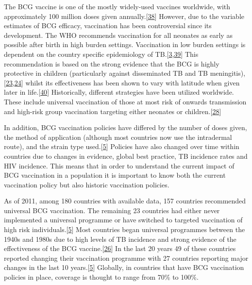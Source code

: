 \documentclass[11pt,twoside]{bristolthesis}
\begin{document}
  The BCG vaccine is one of the mostly widely-used vaccines worldwide, with approximately 100 million doses given annually.{[}\protect\hyperlink{ref-The2004}{38}{]} However, due to the variable estimates of BCG efficacy, vaccination has been controversial since its development. The WHO recommends vaccination for all neonates as early as possible after birth in high burden settings. Vaccination in low burden settings is dependent on the country specific epidemiology of TB.{[}\protect\hyperlink{ref-TheWorldHealthOrganization:2018va}{3},\protect\hyperlink{ref-WHO2017}{39}{]} This recommendation is based on the strong evidence that the BCG is highly protective in children (particularly against disseminated TB and TB meningitis),{[}\protect\hyperlink{ref-Rodrigues1993}{23},\protect\hyperlink{ref-Colditz1994}{24}{]} whilst its effectiveness has been shown to vary with latitude when given later in life.{[}\protect\hyperlink{ref-Mangtani2014}{40}{]} Historically, different strategies have been utilized worldwide. These include universal vaccination of those at most risk of onwards transmission and high-risk group vaccination targeting either neonates or children.{[}\protect\hyperlink{ref-Abubakar2013}{28}{]}
  
  In addition, BCG vaccination policies have differed by the number of doses given, the method of application (although most countries now use the intradermal route), and the strain type used.{[}\protect\hyperlink{ref-Zwerling2011a}{5}{]} Policies have also changed over time within countries due to changes in evidence, global best practice, TB incidence rates and HIV incidence. This means that in order to understand the current impact of BCG vaccination in a population it is important to know both the current vaccination policy but also historic vaccination policies.
  
  As of 2011, among 180 countries with available data, 157 countries recommended universal BCG vaccination. The remaining 23 countries had either never implemented a universal programme or have switched to targeted vaccination of high risk individuals.{[}\protect\hyperlink{ref-Zwerling2011a}{5}{]} Most countries began universal programmes between the 1940s and 1980s due to high levels of TB incidence and strong evidence of the effectiveness of the BCG vaccine.{[}\protect\hyperlink{ref-Hart1972}{26}{]} In the last 20 years 49 of these countries reported changing their vaccination programme with 27 countries reporting major changes in the last 10 years.{[}\protect\hyperlink{ref-Zwerling2011a}{5}{]} Globally, in countries that have BCG vaccination policies in place, coverage is thought to range from 70\% to 100\%.
  
\end{document}
